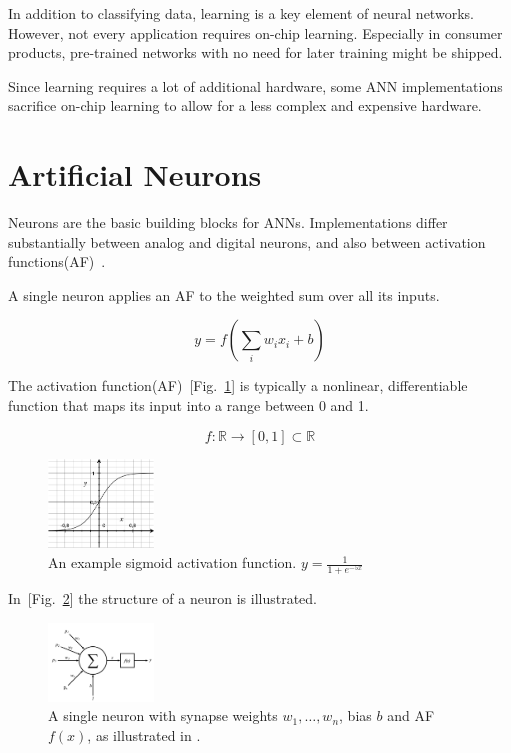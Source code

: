 \documentclass[conference]{IEEEtran}
\begin{document}
    In addition to classifying data, learning is a key element of neural networks.
    However, not every application requires on-chip learning.
    Especially in consumer products, pre-trained networks with no need for later training might be shipped.

    Since learning requires a lot of additional hardware, some ANN implementations sacrifice on-chip learning to allow for a less complex and expensive hardware.


    \section{Artificial Neurons}

    Neurons are the basic building blocks for ANNs.
    Implementations differ substantially between analog and digital neurons, and also between activation functions(AF)~\cite{habib1989digital}.

    A single neuron applies an AF to the weighted sum over all its inputs.

    \[y = f(\sum_i {w_ix_i} + b)\]

    The activation function(AF)~[Fig.~\ref{fig:sigmoid}] is typically a nonlinear, differentiable function that maps its input into a range between 0 and 1.

    \[ f: \mathbb{R} \to [0,1] \subset \mathbb{R} \]

    \begin{figure}[h]
        \centering
        \includegraphics[width=0.25\textwidth]{resources/sigmoid.pdf}
        \caption{An example sigmoid activation function. $y = \frac{1}{1+e^{-5x}}$}
        \label{fig:sigmoid}
    \end{figure}

    In~[Fig.~\ref{fig:neuron}] the structure of a neuron is illustrated.

    \begin{figure}[h]
        \centering
        \includegraphics[width=0.25\textwidth]{resources/neuron.png}
        \caption{A single neuron with synapse weights $w_1,\dots,w_n$, bias $b$ and AF $f(x)$, as illustrated in \cite[Fig.~1]{muthuramalingam2008neural}.}
        \label{fig:neuron}
    \end{figure}
\end{document}
